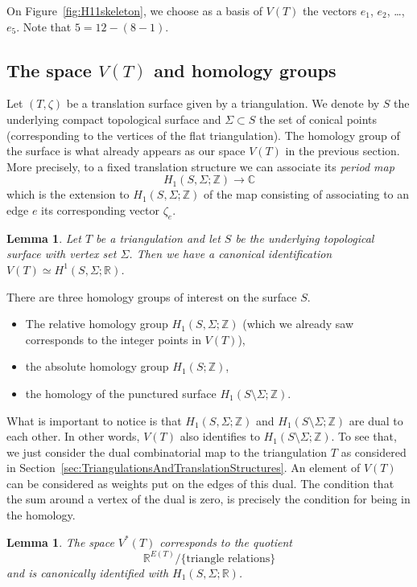 \documentclass[a4paper,12pt]{article}
\def\bC{\mathbb{C}}
\def\bR{\mathbb{R}}
\def\bZ{\mathbb{Z}}
\newtheorem{lemma}[definition]{Lemma}
\begin{document}
On Figure~\ref{fig:H11skeleton}, we choose as a basis of $V(T)$ the vectors
$e_1$, $e_2$, \ldots, $e_5$. Note that $5 = 12 - (8 - 1)$.

\subsection{The space $V(T)$ and homology groups}
Let $(T, \zeta)$ be a translation surface given by a triangulation. We denote
by $S$ the underlying compact topological surface and $\Sigma \subset S$ the
set of conical points (corresponding to the vertices of the flat
triangulation). The homology group of the surface is what already appears as
our space $V(T)$ in the previous section. More precisely, to a fixed
translation structure we can associate its \emph{period map}
\[
H_1(S, \Sigma; \bZ) \to \bC
\]
which is the extension to $H_1(S, \Sigma; \bZ)$ of the map consisting of associating to
an edge $e$ its corresponding vector $\zeta_e$.
\begin{lemma}
Let $T$ be a triangulation and let $S$ be the underlying topological surface
with vertex set $\Sigma$. Then we have a canonical identification
$V(T) \simeq H^1(S, \Sigma; \bR)$.
\end{lemma}

There are three homology groups of interest on the surface $S$.
\begin{itemize}
\item The relative homology group $H_1(S, \Sigma; \bZ)$ (which we already saw corresponds to the integer points in $V(T)$),
\item the absolute homology group $H_1(S; \bZ)$,
\item the homology of the punctured surface $H_1(S \setminus \Sigma; \bZ)$.
\end{itemize}

What is important to notice is that $H_1(S, \Sigma; \bZ)$ and $H_1(S \setminus
\Sigma; \bZ)$ are dual to each other. In other words, $V(T)$ also identifies
to $H_1(S \setminus \Sigma; \bZ)$. To see that, we just consider the dual
combinatorial map to the triangulation $T$ as considered in
Section~\ref{sec:TriangulationsAndTranslationStructures}. An element of
$V(T)$ can be considered as weights put on the edges of this dual.
The condition that the sum around a vertex of the dual is zero,
is precisely the condition for being in the homology.

\begin{lemma}
\label{sec:VT:dual}
The space $V^*(T)$ corresponds to the quotient
\[
\bR^{E(T)} / \{\text{triangle relations}\}
\]
and is canonically identified with $H_1(S, \Sigma; \bR)$.
\end{lemma}
\end{document}
